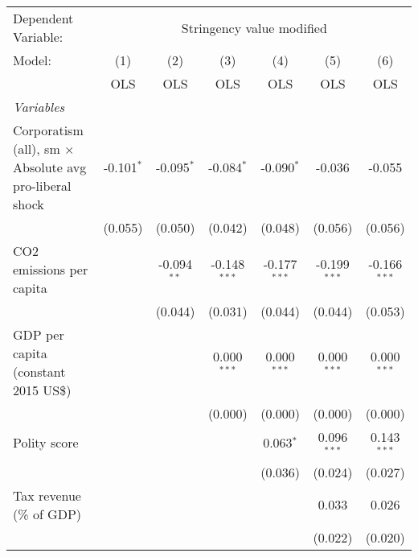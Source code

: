 
\begingroup
\centering
\begin{tabular}{lcccccc}
   \toprule
   Dependent Variable: & \multicolumn{6}{c}{Stringency value modified}\\
   Model:                                                         & (1)          & (2)           & (3)            & (4)            & (5)            & (6)\\  
                                                                  &  OLS         & OLS           & OLS            & OLS            & OLS            & OLS\\  
   \midrule
   \emph{Variables}\\
   Corporatism (all), sm $\times$ Absolute avg pro-liberal shock  & -0.101$^{*}$ & -0.095$^{*}$  & -0.084$^{*}$   & -0.090$^{*}$   & -0.036         & -0.055\\   
                                                                  & (0.055)      & (0.050)       & (0.042)        & (0.048)        & (0.056)        & (0.056)\\   
   CO2 emissions per capita                                       &              & -0.094$^{**}$ & -0.148$^{***}$ & -0.177$^{***}$ & -0.199$^{***}$ & -0.166$^{***}$\\   
                                                                  &              & (0.044)       & (0.031)        & (0.044)        & (0.044)        & (0.053)\\   
   GDP per capita (constant 2015 US\$)                            &              &               & 0.000$^{***}$  & 0.000$^{***}$  & 0.000$^{***}$  & 0.000$^{***}$\\   
                                                                  &              &               & (0.000)        & (0.000)        & (0.000)        & (0.000)\\   
   Polity score                                                   &              &               &                & 0.063$^{*}$    & 0.096$^{***}$  & 0.143$^{***}$\\   
                                                                  &              &               &                & (0.036)        & (0.024)        & (0.027)\\   
   Tax revenue (\% of GDP)                                        &              &               &                &                & 0.033          & 0.026\\   
                                                                  &              &               &                &                & (0.022)        & (0.020)\\   

\end{tabular}
